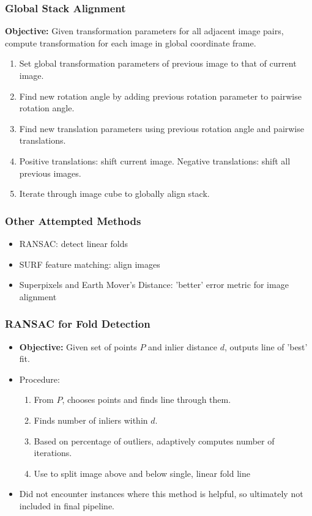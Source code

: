\documentclass{beamer}
\begin{document}
\begin{frame}
\frametitle{Global Stack Alignment}
\textbf{Objective:} Given transformation parameters for all adjacent image pairs, compute transformation for each image in global coordinate frame.
\begin{enumerate}
\item Set global transformation parameters of previous image to that of current image. 
\item Find new rotation angle by adding previous rotation parameter to pairwise rotation angle. 
\item Find new translation parameters using previous rotation angle and pairwise translations.
\item Positive translations: shift current image. Negative translations: shift all previous images.
\item Iterate through image cube to globally align stack. 
\end{enumerate}
\end{frame}

\begin{frame}
\frametitle{Other Attempted Methods}
\begin{itemize}
\item RANSAC: detect linear folds
\item SURF feature matching: align images
\item Superpixels and Earth Mover's Distance: 'better' error metric for image alignment
\end{itemize}
\end{frame}

\begin{frame}
\frametitle{RANSAC for Fold Detection}
\begin{itemize}
\item \textbf{Objective:} Given set of points $P$ and inlier distance $d$, outputs line of 'best' fit.
\item Procedure: 
\begin{enumerate}
\item From $P$, chooses points and finds line through them. 
\item Finds number of inliers within $d$. 
\item Based on percentage of outliers, adaptively computes number of iterations.
\item Use to split image above and below single, linear fold line
\end{enumerate}
\item Did not encounter instances where this method is helpful, so ultimately not included in final pipeline.
\end{itemize}
\end{frame}
\end{document}
